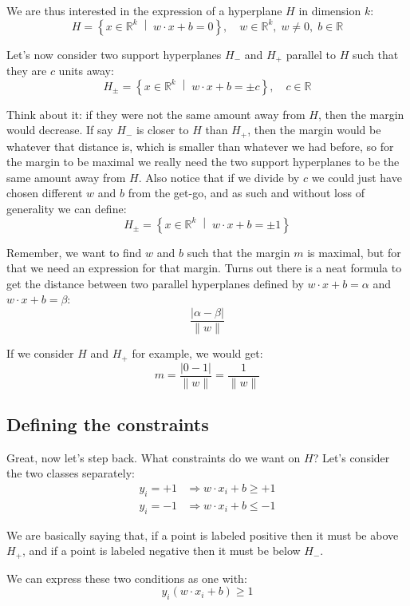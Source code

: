\documentclass[12pt,a4paper]{article}
\begin{document}
We are thus interested in the expression of a hyperplane $H$ in dimension $k$:
\[
H = \left\{ x \in \mathbb{R}^k \;\middle|\; w \cdot x + b = 0 \right\}, \quad w \in \mathbb{R}^k,\; w \neq 0,\; b \in \mathbb{R}
\]

Let's now consider two support hyperplanes $H_-$ and $H_+$ parallel to $H$ such that they are $c$ units away:
\[
H_{\pm} = \left\{ x \in \mathbb{R}^k \;\middle|\; w \cdot x + b = \pm c \right\}, \quad c \in \mathbb{R}
\]

Think about it: if they were not the same amount away from $H$, then the margin would decrease. If say $H_-$ is closer to $H$ than $H_+$, then the margin would be whatever that distance is, which is smaller than whatever we had before, so for the margin to be maximal we really need the two support hyperplanes to be the same amount away from $H$. Also notice that if we divide by $c$ we could just have chosen different $w$ and $b$ from the get-go, and as such and without loss of generality we can define:
\[
H_{\pm} = \left\{ x \in \mathbb{R}^k \;\middle|\; w \cdot x + b = \pm 1 \right\}
\]

Remember, we want to find $w$ and $b$ such that the margin $m$ is maximal, but for that we need an expression for that margin. Turns out there is a neat formula to get the distance between two parallel hyperplanes defined by $w \cdot x + b = \alpha$ and $w \cdot x + b = \beta$:
\[
\frac{|\alpha - \beta|}{\|w\|}
\]

If we consider $H$ and $H_+$ for example, we would get:
\[
m = \frac{|0 - 1|}{\|w\|} = \frac{1}{\|w\|}
\]

\subsection{Defining the constraints}

Great, now let's step back. What constraints do we want on $H$? Let's consider the two classes separately:
\begin{align*}
y_i = +1 &\Rightarrow w \cdot x_i + b \geq +1 \\
y_i = -1 &\Rightarrow w \cdot x_i + b \leq -1
\end{align*}

We are basically saying that, if a point is labeled positive then it must be above $H_+$, and if a point is labeled negative then it must be below $H_-$.

We can express these two conditions as one with:
\[
y_i(w \cdot x_i + b) \geq 1
\]
\end{document}
